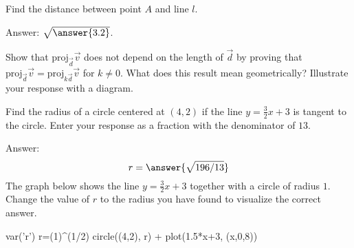 \documentclass{ximera}
\begin{document}
\begin{problem}\label{prob:distpttoline}
Find the distance between point $A$ and line $l$.

\begin{center}
\end{center}

Answer: $\sqrt{\answer{3.2}}$.
\end{problem}
\begin{problem}\label{prob:proj3}
Show that $\mbox{proj}_{\vec{d}}\vec{v}$ does not depend on the length of $\vec{d}$ by proving that $\mbox{proj}_{\vec{d}}\vec{v}=\mbox{proj}_{k\vec{d}}\vec{v}$ for $k\neq 0$.  What does this result mean geometrically?  Illustrate your response with a diagram.
\end{problem}
\begin{problem}\label{prob:circletangenttoline}
Find the radius of a circle centered at $(4, 2)$ if the line $y=\frac{3}{2}x+3$ is tangent to the circle.  Enter your response as a fraction with the denominator of $13$.

Answer:
$$r=\answer{\sqrt{196/13}}$$
The graph below shows the line $y=\frac{3}{2}x+3$ together with a circle of radius $1$.  Change the value of $r$ to the radius you have found to visualize the correct answer.

\begin{sageCell}
var('r')
r=(1)^(1/2)
circle((4,2), r) + plot(1.5*x+3, (x,0,8))
\end{sageCell}



\end{problem}
\end{document}

